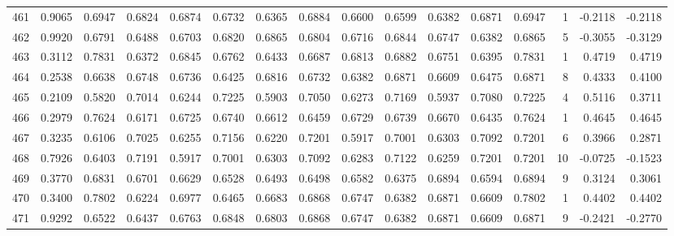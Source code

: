 \begin{tabular}{lrrrrrrrrrrrrrrr}
461 &      0.9065 &  0.6947 &  0.6824 &  0.6874 &  0.6732 &  0.6365 &  0.6884 &  0.6600 &  0.6599 &  0.6382 &   0.6871 &     0.6947 &      1 &                   -0.2118 &                    -0.2118 \\
462 &      0.9920 &  0.6791 &  0.6488 &  0.6703 &  0.6820 &  0.6865 &  0.6804 &  0.6716 &  0.6844 &  0.6747 &   0.6382 &     0.6865 &      5 &                   -0.3055 &                    -0.3129 \\
463 &      0.3112 &  0.7831 &  0.6372 &  0.6845 &  0.6762 &  0.6433 &  0.6687 &  0.6813 &  0.6882 &  0.6751 &   0.6395 &     0.7831 &      1 &                    0.4719 &                     0.4719 \\
464 &      0.2538 &  0.6638 &  0.6748 &  0.6736 &  0.6425 &  0.6816 &  0.6732 &  0.6382 &  0.6871 &  0.6609 &   0.6475 &     0.6871 &      8 &                    0.4333 &                     0.4100 \\
465 &      0.2109 &  0.5820 &  0.7014 &  0.6244 &  0.7225 &  0.5903 &  0.7050 &  0.6273 &  0.7169 &  0.5937 &   0.7080 &     0.7225 &      4 &                    0.5116 &                     0.3711 \\
466 &      0.2979 &  0.7624 &  0.6171 &  0.6725 &  0.6740 &  0.6612 &  0.6459 &  0.6729 &  0.6739 &  0.6670 &   0.6435 &     0.7624 &      1 &                    0.4645 &                     0.4645 \\
467 &      0.3235 &  0.6106 &  0.7025 &  0.6255 &  0.7156 &  0.6220 &  0.7201 &  0.5917 &  0.7001 &  0.6303 &   0.7092 &     0.7201 &      6 &                    0.3966 &                     0.2871 \\
468 &      0.7926 &  0.6403 &  0.7191 &  0.5917 &  0.7001 &  0.6303 &  0.7092 &  0.6283 &  0.7122 &  0.6259 &   0.7201 &     0.7201 &     10 &                   -0.0725 &                    -0.1523 \\
469 &      0.3770 &  0.6831 &  0.6701 &  0.6629 &  0.6528 &  0.6493 &  0.6498 &  0.6582 &  0.6375 &  0.6894 &   0.6594 &     0.6894 &      9 &                    0.3124 &                     0.3061 \\
470 &      0.3400 &  0.7802 &  0.6224 &  0.6977 &  0.6465 &  0.6683 &  0.6868 &  0.6747 &  0.6382 &  0.6871 &   0.6609 &     0.7802 &      1 &                    0.4402 &                     0.4402 \\
471 &      0.9292 &  0.6522 &  0.6437 &  0.6763 &  0.6848 &  0.6803 &  0.6868 &  0.6747 &  0.6382 &  0.6871 &   0.6609 &     0.6871 &      9 &                   -0.2421 &                    -0.2770 \\

\end{tabular}
